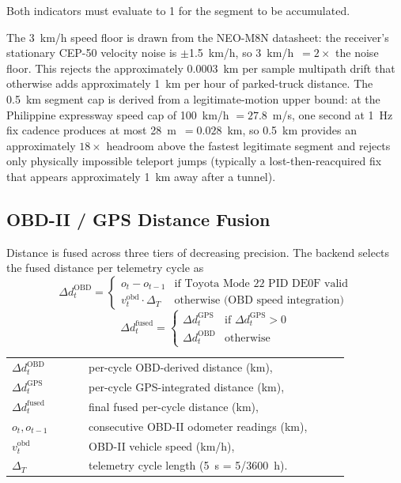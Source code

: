 \vspace{0.5em}
Both indicators must evaluate to 1 for the segment to be accumulated.

The 3~km/h speed floor is drawn from the NEO-M8N datasheet: the receiver's stationary CEP-50 velocity noise is $\pm$1.5~km/h, so 3~km/h~$= 2\times$ the noise floor. This rejects the approximately 0.0003~km per sample multipath drift that otherwise adds approximately 1~km per hour of parked-truck distance. The 0.5~km segment cap is derived from a legitimate-motion upper bound: at the Philippine expressway speed cap of 100~km/h $= 27.8$~m/s, one second at 1~Hz fix cadence produces at most 28~m~$= 0.028$~km, so 0.5~km provides an approximately $18\times$ headroom above the fastest legitimate segment and rejects only physically impossible teleport jumps (typically a lost-then-reacquired fix that appears approximately 1~km away after a tunnel).

\subsection{OBD-II / GPS Distance Fusion}
\label{sec:gps_fusion}

Distance is fused across three tiers of decreasing precision. The backend selects the fused distance per telemetry cycle as
\begin{equation}
\Delta d^{\mathrm{OBD}}_t =
\begin{cases}
o_t - o_{t-1} & \text{if Toyota Mode~22 PID DE0F valid} \\[2pt]
v^{\mathrm{obd}}_t \cdot \Delta_T & \text{otherwise (OBD speed integration)}
\end{cases}
\label{eq:obd_delta}
\end{equation}
\begin{equation}
\Delta d^{\mathrm{fused}}_t =
\begin{cases}
\Delta d^{\mathrm{GPS}}_t & \text{if } \Delta d^{\mathrm{GPS}}_t > 0 \\[2pt]
\Delta d^{\mathrm{OBD}}_t & \text{otherwise}
\end{cases}
\label{eq:fusion_rule}
\end{equation}
\noindent\begin{tabular}{@{}p{0.20\linewidth}@{\quad}p{0.68\linewidth}@{}}
$\Delta d^{\mathrm{OBD}}_t$ & per-cycle OBD-derived distance (km), \\
$\Delta d^{\mathrm{GPS}}_t$ & per-cycle GPS-integrated distance (km), \\
$\Delta d^{\mathrm{fused}}_t$ & final fused per-cycle distance (km), \\
$o_t, o_{t-1}$ & consecutive OBD-II odometer readings (km), \\
$v^{\mathrm{obd}}_t$ & OBD-II vehicle speed (km/h), \\
$\Delta_T$ & telemetry cycle length (5~s = 5/3600~h).
\end{tabular}

